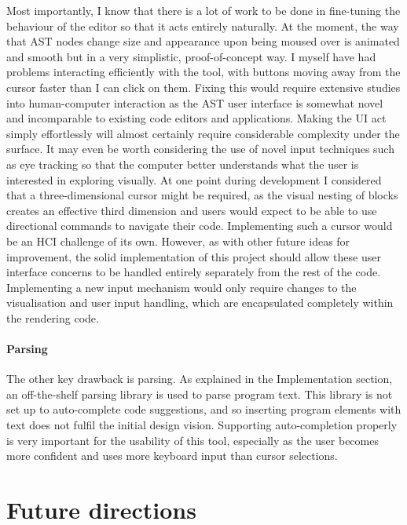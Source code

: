 Most importantly, I know that there is a lot of work to be done in fine-tuning the behaviour of the editor so that it acts entirely naturally. At the moment, the way that AST nodes change size and appearance upon being moused over is animated and smooth but in a very simplistic, proof-of-concept way. I myself have had problems interacting efficiently with the tool, with buttons moving away from the cursor faster than I can click on them. Fixing this would require extensive studies into human-computer interaction as the AST user interface is somewhat novel and incomparable to existing code editors and applications. Making the UI act simply effortlessly will almost certainly require considerable complexity under the surface. It may even be worth considering the use of novel input techniques such as eye tracking so that the computer better understands what the user is interested in exploring visually. At one point during development I considered that a three-dimensional cursor might be required, as the visual nesting of blocks creates an effective third dimension and users would expect to be able to use directional commands to navigate their code. Implementing such a cursor would be an HCI challenge of its own. However, as with other future ideas for improvement, the solid implementation of this project should allow these user interface concerns to be handled entirely separately from the rest of the code. Implementing a new input mechanism would only require changes to the visualisation and user input handling, which are encapsulated completely within the rendering code.

\paragraph{Parsing}

The other key drawback is parsing. As explained in the Implementation section, an off-the-shelf parsing library is used to parse program text. This library is not set up to auto-complete code suggestions, and so inserting program elements with text does not fulfil the initial design vision. Supporting auto-completion properly is very important for the usability of this tool, especially as the user becomes more confident and uses more keyboard input than cursor selections.

\section{Future directions}

